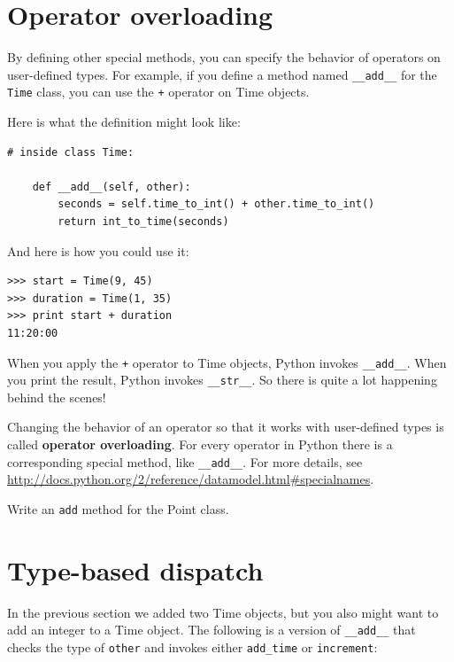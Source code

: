 \documentclass[10pt]{book}
\begin{document}
\section{Operator overloading}
\label{operator.overloading}

By defining other special methods, you can specify the behavior
of operators on user-defined types.  For example, if you define
a method named \verb"__add__" for the {\tt Time} class, you can use the
{\tt +} operator on Time objects.

Here is what the definition might look like:

\begin{verbatim}
# inside class Time:

    def __add__(self, other):
        seconds = self.time_to_int() + other.time_to_int()
        return int_to_time(seconds)
\end{verbatim}
%
And here is how you could use it:

\begin{verbatim}
>>> start = Time(9, 45)
>>> duration = Time(1, 35)
>>> print start + duration
11:20:00
\end{verbatim}
%
When you apply the {\tt +} operator to Time objects, Python invokes
\verb"__add__".  When you print the result, Python invokes 
\verb"__str__".  So there is quite a lot happening behind the scenes!

Changing the behavior of an operator so that it works with
user-defined types is called {\bf operator overloading}.  For every
operator in Python there is a corresponding special method, like 
\verb"__add__".  For more details, see
\url{http://docs.python.org/2/reference/datamodel.html#specialnames}.

\begin{exercise}

Write an {\tt add} method for the Point class.  

\end{exercise}


\section{Type-based dispatch}

In the previous section we added two Time objects, but you
also might want to add an integer to a Time object.  The
following is a version of \verb"__add__"
that checks the type of {\tt other} and invokes either
\verb"add_time" or {\tt increment}:
\end{document}

